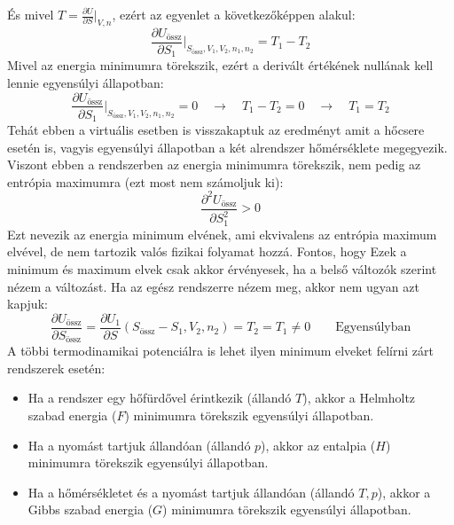 \documentclass[../main.tex]{subfiles}
\begin{document}
És mivel $T = \frac{\partial U}{\partial S}\big|_{V,n}$, ezért az egyenlet a következőképpen alakul:
\begin{equation}
    \frac{\partial U_{\text{össz}}}{\partial S_1}\bigg|_{S_{\text{össz}}, V_1, V_2, n_1, n_2} = T_1 - T_2
\end{equation}
Mivel az energia minimumra törekszik, ezért a derivált értékének nullának kell lennie egyensúlyi állapotban:
\begin{equation}
    \frac{\partial U_{\text{össz}}}{\partial S_1}\bigg|_{S_{\text{össz}}, V_1, V_2, n_1, n_2} = 0 \quad \to \quad T_1 - T_2 = 0 \quad \to \quad T_1 = T_2
\end{equation}
Tehát ebben a virtuális esetben is visszakaptuk az eredményt amit a hőcsere esetén is, vagyis egyensúlyi állapotban a két alrendszer hőmérséklete megegyezik.
Viszont ebben a rendszerben az energia minimumra törekszik, nem pedig az entrópia maximumra (ezt most nem számoljuk ki):
\begin{equation}
    \frac{\partial^2 U_{\text{össz}}}{\partial S_1^2} > 0
\end{equation}
Ezt nevezik az energia minimum elvének, ami ekvivalens az entrópia maximum elvével, de nem tartozik valós fizikai folyamat hozzá. Fontos, hogy Ezek
a minimum és maximum elvek csak akkor érvényesek, ha a belső változók szerint nézem a változást. Ha az egész rendszerre nézem meg, akkor nem ugyan azt kapjuk:
\begin{equation}
    \frac{\partial U_{\text{össz}}}{\partial S_{\text{össz}}} = \frac{\partial U_1}{\partial S} (S_{\text{össz}} - S_1, V_2, n_2) = T_2 = T_1 \neq 0 \qquad \text{Egyensúlyban}
\end{equation}
A többi termodinamikai potenciálra is lehet ilyen minimum elveket felírni zárt rendszerek esetén:
\begin{itemize}
    \item Ha a rendszer egy hőfürdővel érintkezik (állandó $T$), akkor a Helmholtz szabad energia ($F$) minimumra törekszik egyensúlyi állapotban.
    \item Ha a nyomást tartjuk állandóan (állandó $p$), akkor az entalpia ($H$) minimumra törekszik egyensúlyi állapotban.
    \item Ha a hőmérsékletet és a nyomást tartjuk állandóan (állandó $T, p$), akkor a Gibbs szabad energia ($G$) minimumra törekszik egyensúlyi állapotban.
\end{itemize}
\end{document}
